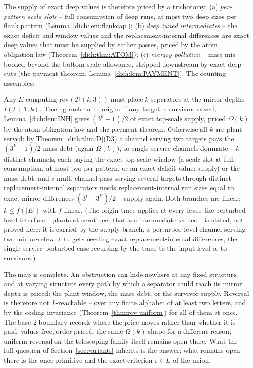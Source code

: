 \documentclass[runningheads,envcountsect]{llncs}
\begin{document}
\noindent The supply of exact deep values is therefore priced by a trichotomy: (a) \emph{per-pattern scale slots} -- full consumption of deep runs, at most two deep sizes per flank pattern (Lemma~\ref{dich:lem:flankcap}); (b) \emph{deep tuned intermediates} -- the exact deficit and window values and the replacement-internal differences are exact deep values that must be supplied by earlier passes, priced by the atom obligation law (Theorem~\ref{dich:thm:ATOM}); (c) \emph{mergey pollution} -- mass mis-booked beyond the bottom-scale allowance, stripped downstream by exact deep cuts (the payment theorem, Lemma~\ref{dich:lem:PAYMENT}). The counting assembles:

\begin{corollary}
    \label{dich:cor:counting}
    Any $E$ computing $\mathrm{rev}(\mathcal D(k;3))$ must place $k$ separators at the mirror depths $I(t{+}1,k)$. Tracing each to its origin: if any target is survivor-served, Lemma~\ref{dich:lem:INH} gives $(3^{k}+1)/2$ of exact top-scale supply, priced $\Omega(k)$ by the atom obligation law and the payment theorem. Otherwise all $k$ are plant-served: by Theorem~\ref{dich:thm:D}(D3) a channel serving two targets pays the $(3^{k}+1)/2$ mass debt (again $\Omega(k)$), so single-service channels dominate -- $k$ distinct channels, each paying the exact top-scale window (a scale slot at full consumption, at most two per pattern, or an exact deficit value: supply) or the mass debt; and a multi-channel pass serving several targets through distinct replacement-internal separators needs replacement-internal run sizes equal to exact mirror differences $(3^{t} - 3^{t'})/2$ -- supply again. Both branches are linear: $k \le f(|E|)$ with $f$ linear. (The origin trace applies at every level; the perturbed-level interface -- plants at scrutinees that are intermediate values -- is stated, not proved here: it is carried by the supply branch, a perturbed-level channel serving two mirror-relevant targets needing exact replacement-internal differences, the single-service perturbed case recursing by the trace to the input level or to survivors.)
\end{corollary}

\noindent The map is complete. An obstruction can hide nowhere at any fixed structure, and at varying structure every path by which a separator could reach its mirror depth is priced: the plant window, the mass debt, or the survivor supply. Reversal is therefore not $L$-reachable -- over any finite alphabet of at least two letters, and by the coding invariance (Theorem~\ref{thm:rev-uniform}) for all of them at once. The base-$2$ boundary records where the price moves rather than whether it is paid: values free, order priced, the same $\Omega(k)$ shape for a different reason; uniform reversal on the telescoping family itself remains open there. What the full question of Section~\ref{sec:variants} inherits is the answer; what remains open there is the once-primitive and the exact criterion $\mathrm{r} \in L$ of the union.
\end{document}

